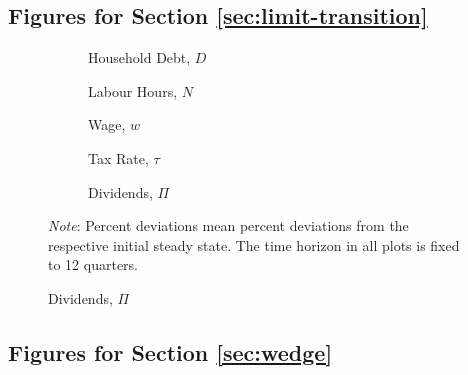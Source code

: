 \documentclass[12pt]{article} %
\numberwithin{equation}{section} %
\numberwithin{figure}{section}
\numberwithin{table}{section}
\begin{document}
\begin{refsection}
\begin{appendices}
\subsection{Figures for Section \ref{sec:limit-transition}}
\label{sec-app:figures-limit-transition}

\begin{figure}[H]
    \caption{Supplement for Figure \ref{fig:baseline-permanent-limit-agg}}%
    \centering
    \begin{subfigure}[b]{0.49\textwidth}
     \caption{Household Debt, $D$}
         \centering
         
     \end{subfigure}
     \hfill
    \begin{subfigure}[b]{0.49\textwidth}
     \caption{Labour Hours, $N$}
         \centering
         
     \end{subfigure}
     \hfill
     \begin{subfigure}[b]{0.49\textwidth}
     \caption{Wage, $w$}
         \centering
         
     \end{subfigure}
     \hfill
    \begin{subfigure}[b]{0.49\textwidth}
    \caption{Tax Rate, $\tau$}
         \centering
         
     \end{subfigure}
     \hfill
     \begin{subfigure}[b]{0.49\textwidth}
     \caption{Dividends, $\Pi$}
         \centering
         
     \end{subfigure}
     \begin{flushleft}
     \footnotesize
	\textit{Note}: Percent deviations mean percent deviations from the respective initial steady state. The time horizon in all plots is fixed to 12 quarters.
	\end{flushleft}
\end{figure}

\subsection{Figures for Section \ref{sec:wedge}}
\label{sec-app:figures-wedge}






\end{appendices}
\end{refsection}
\end{document}
